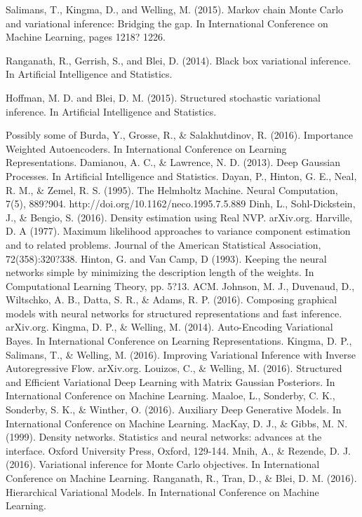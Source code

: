 \documentclass{article}
\begin{document}
Salimans, T., Kingma, D., and Welling, M. (2015). Markov chain Monte Carlo and variational inference: Bridging the gap. In International Conference on Machine Learning, pages 1218? 1226.

Ranganath, R., Gerrish, S., and Blei, D. (2014). Black box variational inference. In Artificial
Intelligence and Statistics.

Hoffman, M. D. and Blei, D. M. (2015). Structured stochastic variational inference. In Artificial Intelligence and Statistics.


Possibly some of 
Burda, Y., Grosse, R., \& Salakhutdinov, R. (2016). Importance Weighted Autoencoders. In International Conference on Learning Representations.
Damianou, A. C., \& Lawrence, N. D. (2013). Deep Gaussian Processes. In Artificial Intelligence and Statistics.
Dayan, P., Hinton, G. E., Neal, R. M., \& Zemel, R. S. (1995). The Helmholtz Machine. Neural Computation, 7(5), 889?904. http://doi.org/10.1162/neco.1995.7.5.889
Dinh, L., Sohl-Dickstein, J., \& Bengio, S. (2016). Density estimation using Real NVP. arXiv.org.
Harville, D. A (1977). Maximum likelihood approaches to variance component estimation and to related problems. Journal of the American Statistical Association, 72(358):320?338.
Hinton, G. and Van Camp, D (1993). Keeping the neural networks simple by minimizing the description length of the weights. In Computational Learning Theory, pp. 5?13. ACM.
Johnson, M. J., Duvenaud, D., Wiltschko, A. B., Datta, S. R., \& Adams, R. P. (2016). Composing graphical models with neural networks for structured representations and fast inference. arXiv.org.
Kingma, D. P., \& Welling, M. (2014). Auto-Encoding Variational Bayes. In International Conference on Learning Representations.
Kingma, D. P., Salimans, T., \& Welling, M. (2016). Improving Variational Inference with Inverse Autoregressive Flow. arXiv.org.
Louizos, C., \& Welling, M. (2016). Structured and Efficient Variational Deep Learning with Matrix Gaussian Posteriors. In International Conference on Machine Learning.
Maaloe, L., Sonderby, C. K., Sonderby, S. K., \& Winther, O. (2016). Auxiliary Deep Generative Models. In International Conference on Machine Learning.
MacKay, D. J., \& Gibbs, M. N. (1999). Density networks. Statistics and neural networks: advances at the interface. Oxford University Press, Oxford, 129-144.
Mnih, A., \& Rezende, D. J. (2016). Variational inference for Monte Carlo objectives. In International Conference on Machine Learning.
Ranganath, R., Tran, D., \& Blei, D. M. (2016). Hierarchical Variational Models. In International Conference on Machine Learning.
\end{document}
